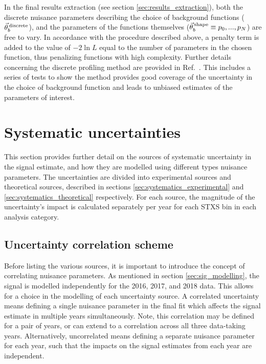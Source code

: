 In the final results extraction (see section \ref{sec:results_extraction}), both the discrete nuisance parameters describing the choice of background functions ($\vec{\theta}^{\,\rm{discrete}}_{b}$), and the parameters of the functions themselves ($\vec{\theta}^{\,\rm{shape}}_{b} \equiv p_0,...,p_N$) are free to vary. In accordance with the procedure described above, a penalty term is added to the value of $-2\ln{L}$ equal to the number of parameters in the chosen function, thus penalizing functions with high complexity. Further details concerning the discrete profiling method are provided in Ref.~\cite{Dauncey:2014xga}. This includes a series of tests to show the method provides good coverage of the uncertainty in the choice of background function and leads to unbiased estimates of the parameters of interest.

\section{Systematic uncertainties}\label{sec:systematics}
This section provides further detail on the sources of systematic uncertainty in the signal estimate, and how they are modelled using different types nuisance parameters. The uncertainties are divided into experimental sources and theoretical sources, described in sections \ref{sec:systematics_experimental} and \ref{sec:systematics_theoretical} respectively. For each source, the magnitude of the uncertainty's impact is calculated separately per year for each STXS bin in each analysis category.

\subsection{Uncertainty correlation scheme}\label{sec:correlation_scheme}
Before listing the various sources, it is important to introduce the concept of correlating nuisance parameters. As mentioned in section \ref{sec:sig_modelling}, the signal is modelled independently for the 2016, 2017, and 2018 data. This allows for a choice in the modelling of each uncertainty source. A correlated uncertainty means defining a single nuisance parameter in the final fit which affects the signal estimate in multiple years simultaneously. Note, this correlation may be defined for a pair of years, or can extend to a correlation across all three data-taking years. Alternatively, uncorrelated means defining a separate nuisance parameter for each year, such that the impacts on the signal estimates from each year are independent. 

